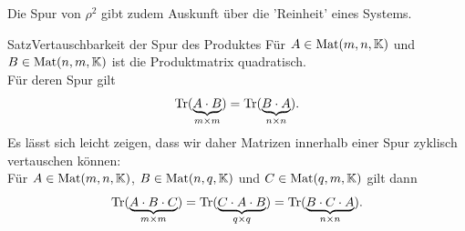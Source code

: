 Die Spur von $\rho^2$ gibt zudem Auskunft über die 'Reinheit' eines Systems.
\begin{Satz}
{Satz}{Vertauschbarkeit der Spur des Produktes}
Für $A\in\text{Mat}(m,n,\mathbb{K})$ und $B\in\text{Mat}(n,m,\mathbb{K})$ ist die Produktmatrix quadratisch.\\
Für deren Spur gilt
\begin{equation*}
    \text{Tr}(\underbrace{A\cdot B}_{m\times m})=\text{Tr}(\underbrace{B\cdot A}_{n\times n}).
\end{equation*}
Es lässt sich leicht zeigen, dass wir daher Matrizen innerhalb einer Spur zyklisch vertauschen können:\\
Für $A\in\text{Mat}(m,n,\mathbb{K})$, $B\in\text{Mat}(n,q,\mathbb{K})$ und $C\in\text{Mat}(q,m,\mathbb{K})$ gilt dann
\begin{equation*}
    \text{Tr}(\underbrace{A\cdot B\cdot C}_{m\times m})=\text{Tr}(\underbrace{C\cdot A\cdot B}_{q\times q})=\text{Tr}(\underbrace{B\cdot C\cdot  A}_{n\times n}).
\end{equation*}
\end{Satz}


